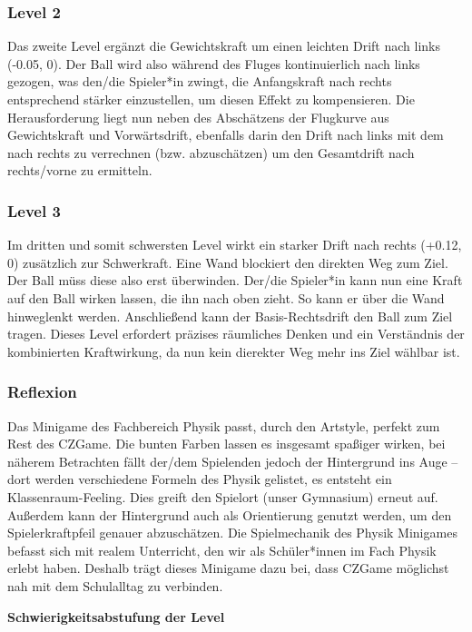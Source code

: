 \subsubsection{Level 2}
Das zweite Level ergänzt die Gewichtskraft um einen leichten Drift nach links (-0.05, 0).
Der Ball wird also während des Fluges kontinuierlich nach links gezogen, was den/die Spieler*in zwingt, die Anfangskraft nach rechts entsprechend stärker einzustellen, um diesen Effekt zu kompensieren.
Die Herausforderung liegt nun neben des Abschätzens der Flugkurve aus Gewichtskraft und Vorwärtsdrift, ebenfalls darin den Drift nach links mit dem nach rechts zu verrechnen (bzw. abzuschätzen) um den Gesamtdrift nach rechts/vorne zu ermitteln.

\subsubsection{Level 3}
Im dritten und somit schwersten Level wirkt ein starker Drift nach rechts (+0.12, 0) zusätzlich zur Schwerkraft.
Eine Wand blockiert den direkten Weg zum Ziel. Der Ball müss diese also erst überwinden.
Der/die Spieler*in kann nun eine Kraft auf den Ball wirken lassen, die ihn nach oben zieht. So kann er über die Wand hinweglenkt werden. Anschließend kann der Basis-Rechtsdrift den Ball zum Ziel tragen.
Dieses Level erfordert präzises räumliches Denken und ein Verständnis der kombinierten Kraftwirkung, da nun kein dierekter Weg mehr ins Ziel wählbar ist.

\subsubsection{Reflexion}

Das Minigame des Fachbereich Physik passt, durch den Artstyle, perfekt zum Rest des CZGame. Die bunten Farben lassen es insgesamt spaßiger wirken, bei näherem Betrachten fällt der/dem Spielenden jedoch der Hintergrund ins Auge – dort werden verschiedene Formeln des Physik gelistet, es entsteht ein Klassenraum-Feeling. Dies greift den Spielort (unser Gymnasium) erneut auf.
Außerdem kann der Hintergrund auch als Orientierung genutzt werden, um den Spielerkraftpfeil genauer abzuschätzen.
Die Spielmechanik des Physik Minigames befasst sich mit realem Unterricht, den wir als Schüler*innen im Fach Physik erlebt haben. Deshalb trägt dieses Minigame dazu bei, dass CZGame möglichst nah mit dem Schulalltag zu verbinden.

\textbf{Schwierigkeitsabstufung der Level} \\

